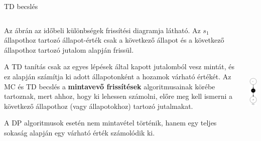 \documentclass[english, aspectratio=169]{beamer}
\begin{document}
\begin{frame}{TD becslés}
\begin{columns}
\begin{column}{.7\textwidth}
Az ábrán az időbeli különbségek frissítési diagramja látható. Az $s_1$ állapothoz tartozó állapot-érték csak a következő állapot és a következő állapothoz tartozó jutalom alapján frissül. \par\smallskip
A TD tanítás csak az egyes lépések által kapott jutalomból vesz mintát, és ez alapján számítja ki adott állapotonként a hozamok várható értékét. Az MC és TD becslés a \textbf{mintavevő frissítések} algoritmusainak körébe tartoznak, mert ahhoz, hogy ki lehessen számolni, előre meg kell ismerni a következő állapothoz (vagy állapotokhoz) tartozó jutalmakat.\par\smallskip
A DP algoritmusok esetén nem mintavétel történik, hanem egy teljes sokaság alapján egy várható érték számolódik ki.
\end{column}
\begin{column}{.3\textwidth}
\begin{center}
\includegraphics[height=7cm, keepaspectratio]{graphs/mc_td_4.png}
\end{center}
\end{column}
\end{columns}
\end{frame}
\end{document}
